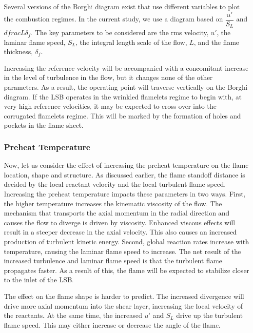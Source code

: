 Several versions of the Borghi diagram exist that use different variables to plot the combustion regimes.
In the current study, we use a diagram based on \(\dfrac{ u' }{ S_L }\) and \(dfrac{ L }{ \delta_f }\).
The key parameters to be considered are the rms velocity, \(u'\), the laminar flame speed, \(S_L\), the integral length scale of the flow, \(L\), and the flame thickness, \(\delta_f\).

Increasing the reference velocity will be accompanied with a concomitant increase in the level of turbulence in the flow, but it changes none of the other parameters.
As a result, the operating point will traverse vertically on the Borghi diagram.
If the LSB operates in the wrinkled flamelets regime to begin with, at very high reference velocities, it may be expected to cross over into the corrugated flamelets regime.
This will be marked by the formation of holes and pockets in the flame sheet.

\subsubsection{Preheat Temperature}

Now, let us consider the effect of increasing the preheat temperature on the flame location, shape and structure.
As discussed earlier, the flame standoff distance is decided by the local reactant velocity and the local turbulent flame speed.
Increasing the preheat temperature impacts these parameters in two ways.
First, the higher temperature increases the kinematic viscosity of the flow.
The mechanism that transports the axial momentum in the radial direction and causes the flow to diverge is driven by viscosity.
Enhanced viscous effects will result in a steeper decrease in the axial velocity.
This also causes an increased production of turbulent kinetic energy.
Second, global reaction rates increase with temperature, causing the laminar flame speed to increase.
The net result of the increased turbulence and laminar flame speed is that the turbulent flame propagates faster.
As a result of this, the flame will be expected to stabilize closer to the inlet of the LSB.

The effect on the flame shape is harder to predict.
The increased divergence will drive more axial momentum into the shear layer, increasing the local velocity of the reactants.
At the same time, the increased \(u'\) and \(S_L\) drive up the turbulent flame speed.
This may either increase or decrease the angle of the flame.

